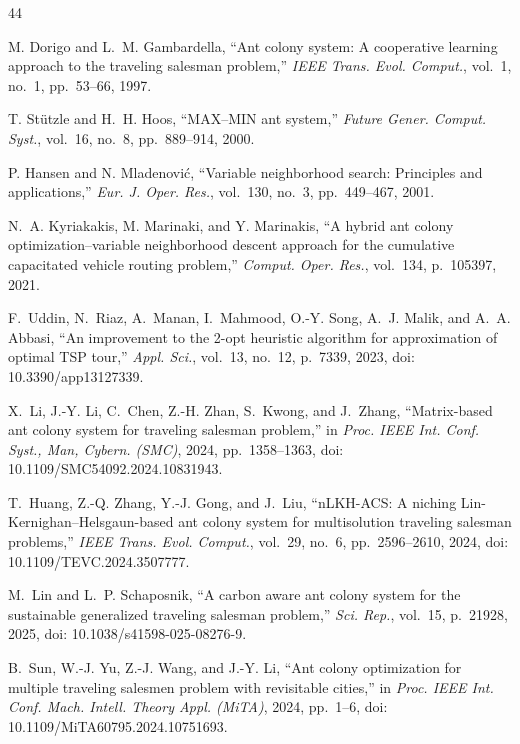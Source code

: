 \documentclass[lettersize,journal]{IEEEtran}
\begin{document}
\begin{thebibliography}{44}

M. Dorigo and L.~M. Gambardella, ``Ant colony system: A cooperative learning approach to the traveling salesman problem,'' \textit{IEEE Trans. Evol. Comput.}, vol.~1, no.~1, pp.~53--66, 1997.


T. St\"utzle and H.~H. Hoos, ``MAX--MIN ant system,'' \textit{Future Gener. Comput. Syst.}, vol.~16, no.~8, pp.~889--914, 2000.


P. Hansen and N. Mladenovi\'c, ``Variable neighborhood search: Principles and applications,'' \textit{Eur. J. Oper. Res.}, vol.~130, no.~3, pp.~449--467, 2001.


N.~A. Kyriakakis, M. Marinaki, and Y. Marinakis, ``A hybrid ant colony optimization--variable neighborhood descent approach for the cumulative capacitated vehicle routing problem,'' \textit{Comput. Oper. Res.}, vol.~134, p.~105397, 2021.


F.~Uddin, N.~Riaz, A.~Manan, I.~Mahmood, O.-Y. Song, A.~J. Malik, and A.~A. Abbasi, ``An improvement to the 2-opt heuristic algorithm for approximation of optimal TSP tour,'' \textit{Appl. Sci.}, vol.~13, no.~12, p.~7339, 2023, doi: 10.3390/app13127339.


X.~Li, J.-Y. Li, C.~Chen, Z.-H. Zhan, S.~Kwong, and J.~Zhang, ``Matrix-based ant colony system for traveling salesman problem,'' in \textit{Proc. IEEE Int. Conf. Syst., Man, Cybern. (SMC)}, 2024, pp.~1358--1363, doi: 10.1109/SMC54092.2024.10831943.


T.~Huang, Z.-Q. Zhang, Y.-J. Gong, and J.~Liu, ``nLKH-ACS: A niching Lin-Kernighan--Helsgaun-based ant colony system for multisolution traveling salesman problems,'' \textit{IEEE Trans. Evol. Comput.}, vol.~29, no.~6, pp.~2596--2610, 2024, doi: 10.1109/TEVC.2024.3507777.


M.~Lin and L.~P. Schaposnik, ``A carbon aware ant colony system for the sustainable generalized traveling salesman problem,'' \textit{Sci. Rep.}, vol.~15, p.~21928, 2025, doi: 10.1038/s41598-025-08276-9.


B.~Sun, W.-J. Yu, Z.-J. Wang, and J.-Y. Li, ``Ant colony optimization for multiple traveling salesmen problem with revisitable cities,'' in \textit{Proc. IEEE Int. Conf. Mach. Intell. Theory Appl. (MiTA)}, 2024, pp.~1--6, doi: 10.1109/MiTA60795.2024.10751693.


\end{thebibliography}
\end{document}
